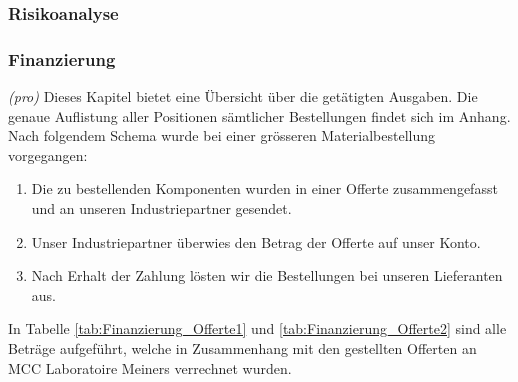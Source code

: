 \subsubsection{Risikoanalyse}

\subsubsection{Finanzierung} \label{finanzierung}
\textit{(pro)} Dieses Kapitel bietet eine Übersicht über die getätigten Ausgaben. Die genaue Auflistung aller Positionen sämtlicher Bestellungen findet sich im Anhang. Nach folgendem Schema wurde bei einer grösseren Materialbestellung vorgegangen:

\begin{enumerate}
	\item Die zu bestellenden Komponenten wurden in einer Offerte zusammengefasst und an unseren Industriepartner gesendet.
	\item Unser Industriepartner überwies den Betrag der Offerte auf unser Konto.
	\item Nach Erhalt der Zahlung lösten wir die Bestellungen bei unseren Lieferanten aus.
\end{enumerate}


In Tabelle \ref{tab:Finanzierung_Offerte1} und \ref{tab:Finanzierung_Offerte2} sind alle Beträge aufgeführt, welche in Zusammenhang mit den gestellten Offerten an MCC Laboratoire Meiners verrechnet wurden. 

